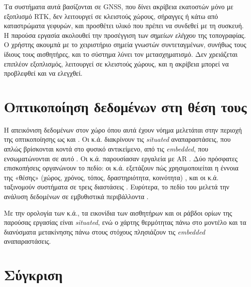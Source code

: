Τα συστήματα αυτά βασίζονται σε GNSS, που δίνει ακρίβεια εκατοστών μόνο με εξοπλισμό RTK, δεν λειτουργεί σε κλειστούς χώρους, σήραγγες ή κάτω από καταστρώματα γεφυρών, και προσθέτει υλικό που πρέπει να συνδεθεί με τη συσκευή. Η παρούσα εργασία ακολουθεί την προσέγγιση των \emph{σημείων ελέγχου} της τοπογραφίας. Ο χρήστης ακουμπά με το χειριστήριο σημεία γνωστών συντεταγμένων, συνήθως τους ίδιους τους αισθητήρες, και το σύστημα λύνει τον μετασχηματισμό. Δεν χρειάζεται επιπλέον εξοπλισμός, λειτουργεί σε κλειστούς χώρους, και η ακρίβεια μπορεί να προβλεφθεί και να ελεγχθεί.

\section{Οπτικοποίηση δεδομένων στη θέση τους}
\label{sec:rw-situated}

Η απεικόνιση δεδομένων στον χώρο όπου αυτά έχουν νόημα μελετάται στην περιοχή της οπτικοποίησης ως  και . Οι  κ.ά. διακρίνουν τις \emph{situated} αναπαραστάσεις, που απλώς βρίσκονται κοντά στο φυσικό αντικείμενο, από τις \emph{embedded}, που ενσωματώνονται σε αυτό \cite{willett2017embedded}. Οι  κ.ά. παρουσίασαν εργαλεία  με AR \cite{elsayed2016situated}. Δύο πρόσφατες επισκοπήσεις οργανώνουν το πεδίο: οι  κ.ά. εξετάζουν πώς χρησιμοποιείται η έννοια της «θέσης» (χώρος, χρόνος, τόπος, δραστηριότητα, κοινότητα) \cite{bressa2022situated}, και οι  κ.ά. ταξινομούν συστήματα  σε τρεις διαστάσεις \cite{shin2023situated}. Ευρύτερα, το πεδίο του  μελετά την ανάλυση δεδομένων σε εμβυθιστικά περιβάλλοντα \cite{marriott2018immersive}.

Με την ορολογία των  κ.ά., τα εικονίδια των αισθητήρων και οι ράβδοι ορίων της παρούσας εργασίας είναι \emph{situated}, ενώ ο χάρτης θερμότητας πάνω στο μοντέλο και τα διανύσματα μετακίνησης πάνω στους στόχους πλησιάζουν τις \emph{embedded} αναπαραστάσεις.


\section{Σύγκριση}
\label{sec:rw-comparison}

